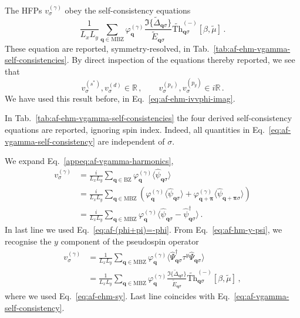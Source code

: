 The HFPs $v_\sigma^{(\gamma)}$ obey the self-consistency equations
\begin{equation}\label{eq:af-vgamma-self-consistency}
	\frac{1}{L_x L_y} \sum_{\mathbf{q}\in\mathrm{MBZ}} \varphi_\mathbf{q}^{(\gamma)}
	\frac{\Im\lbrace\tilde{\Delta}_{\mathbf{q}\sigma}\rbrace}{\tilde{E}_{\mathbf{q}\sigma}} \tilde{\mathrm{Th}}_{\mathbf{q}\sigma}^{(-)}[\beta,\tilde{\mu}] \, .
\end{equation}
These equation are reported, symmetry-resolved, in Tab.~\ref{tab:af-ehm-vgamma-self-consistencies}. By direct inspection of the equations thereby reported, we see that
\begin{equation}\label{appeq:af-v-Re-iRe}
	v^{(s^*)}_\sigma, v^{(d)}_\sigma \in \mathbb{R} \, ,
	\qquad
	v^{(p_x)}_\sigma, v^{(p_y)}_\sigma \in i\mathbb{R} \, .
\end{equation}
We have used this result before, in Eq.~\eqref{eq:af-ehm-ivvphi-imag}. 

In Tab.~\ref{tab:af-ehm-vgamma-self-consistencies} the four derived self-consistency equations are reported, ignoring spin index. Indeed, all quantities in Eq.~\eqref{eq:af-vgamma-self-consistency} are independent of $\sigma$.

\begin{tabproof}
	
	We expand Eq.~\eqref{appeq:af-vgamma-harmonics},
	\[
	\begin{aligned}
		v^{(\gamma)}_\sigma &= \frac{i}{L_x L_y} \sum_{\mathbf{q}\in\mathrm{BZ}} \varphi_\mathbf{q}^{(\gamma)}
		\langle
		\hat \psi_{\mathbf{q}\sigma}
		\rangle \\
		&= \frac{i}{L_x L_y} \sum_{\mathbf{q}\in\mathrm{MBZ}} \left(
		\varphi_\mathbf{q}^{(\gamma)}
		\langle
		\hat \psi_{\mathbf{q}\sigma}
		\rangle
		+
		\varphi_{\mathbf{q}+\bm{\pi}}^{(\gamma)}
		\langle
		\hat \psi_{\mathbf{q}+\bm{\pi}\sigma}
		\rangle
		\right) \\
		&= \frac{i}{L_x L_y} \sum_{\mathbf{q}\in\mathrm{MBZ}} \varphi_\mathbf{q}^{(\gamma)}
		\langle
		\hat \psi_{\mathbf{q}\sigma} -
		\hat \psi_{\mathbf{q}\sigma}^\dagger
		\rangle \, .
	\end{aligned}
	\]
	In last line we used Eq.~\eqref{eq:af-(phi+pi)=-phi}. From Eq.~\eqref{eq:af-hm-y-psi}, we recognise the $y$ component of the pseudospin operator
	\begin{align}
		v^{(\gamma)}_\sigma &= \frac{1}{L_x L_y} \sum_{\mathbf{q}\in\mathrm{MBZ}} \varphi_\mathbf{q}^{(\gamma)}
		\langle
		\hat \Psi_{\mathbf{q}\sigma}^\dagger \tau^y \hat \Psi_{\mathbf{q}\sigma}
		\rangle \nonumber \\
		&= \frac{1}{L_x L_y} \sum_{\mathbf{q}\in\mathrm{MBZ}} \varphi_\mathbf{q}^{(\gamma)}
		\frac{\Im\lbrace\tilde{\Delta}_{\mathbf{q}\sigma}\rbrace}{\tilde{E}_{\mathbf{q}\sigma}} \tilde{\mathrm{Th}}_{\mathbf{q}\sigma}^{(-)}[\beta,\tilde{\mu}] \, , \label{eq:af-vgamma-chain}
	\end{align}
	where we used Eq.~\eqref{eq:af-ehm-sy}. Last line coincides with Eq.~\eqref{eq:af-vgamma-self-consistency}.
\end{tabproof}

